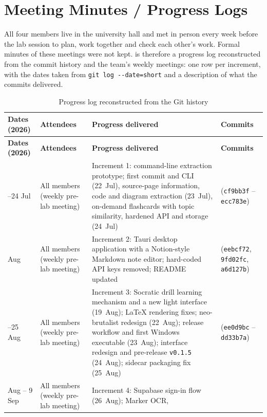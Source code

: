 \chapter{Meeting Minutes / Progress Logs}\label{app:minutes}

All four members live in the university hall and met in person every week before the lab session to plan,
work together and check each other's work. Formal minutes of these meetings were not kept. 
is therefore a progress log reconstructed from the commit history and the team's weekly meetings: one row per
increment, with the dates taken from \texttt{git log -{}-date=short} and a description of what the commits
delivered.

\begin{small}
\begin{longtable}{@{}>{\raggedright\arraybackslash}p{2.1cm} >{\raggedright\arraybackslash}p{2.4cm} >{\raggedright\arraybackslash}p{7.2cm} >{\raggedright\arraybackslash}p{2.3cm}@{}}
\caption{Progress log reconstructed from the Git history}\label{tab:meetings}\\
\toprule
\textbf{Dates (2026)} & \textbf{Attendees} & \textbf{Progress delivered} & \textbf{Commits}\\
\midrule
\endfirsthead
\toprule
\textbf{Dates (2026)} & \textbf{Attendees} & \textbf{Progress delivered} & \textbf{Commits}\\
\midrule
\endhead
\bottomrule
\endfoot
22--24 Jul & All members (weekly pre-lab meeting) & Increment 1: command-line extraction prototype; first commit and
CLI (22~Jul), source-page information, code and diagram extraction (23~Jul), on-demand flashcards with topic
similarity, hardened API and storage (24~Jul) & 9 (\texttt{cf9bb3f} -- \texttt{ecc783e})\\
5 Aug & All members (weekly pre-lab meeting) & Increment 2: Tauri desktop application with a Notion-style
Markdown note editor; hard-coded API keys removed; README updated & 3 (\texttt{eebcf72}, \texttt{9fd02fc},
\texttt{a6d127b})\\
19--25 Aug & All members (weekly pre-lab meeting) & Increment 3: Socratic drill learning mechanism and a new
light interface (19~Aug); LaTeX rendering fixes; neo-brutalist redesign (22~Aug); release workflow and first
Windows executable (23~Aug); interface redesign and pre-release \texttt{v0.1.5} (24~Aug); sidecar packaging fix
(25~Aug) & 10 (\texttt{ee0d9bc} -- \texttt{dd33b7a})\\
26 Aug -- 9 Sep & All members (weekly pre-lab meeting) & Increment 4: Supabase sign-in flow (26~Aug); Marker OCR,

\end{longtable}
\end{small}
